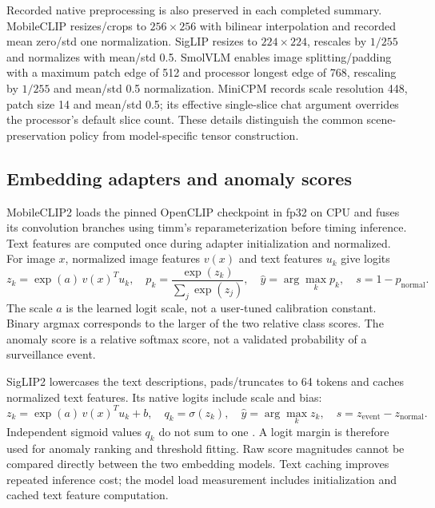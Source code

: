 \documentclass[11pt,a4paper]{article}
\begin{document}
Recorded native preprocessing is also preserved in each completed summary. MobileCLIP resizes/crops to $256\times256$ with bilinear interpolation and recorded mean zero/std one normalization. SigLIP resizes to $224\times224$, rescales by $1/255$ and normalizes with mean/std 0.5. SmolVLM enables image splitting/padding with a maximum patch edge of 512 and processor longest edge of 768, rescaling by $1/255$ and mean/std 0.5 normalization. MiniCPM records scale resolution 448, patch size 14 and mean/std 0.5; its effective single-slice chat argument overrides the processor's default slice count. These details distinguish the common scene-preservation policy from model-specific tensor construction.

\subsection{Embedding adapters and anomaly scores}
MobileCLIP2 loads the pinned OpenCLIP checkpoint in fp32 on CPU and fuses its convolution branches using timm's reparameterization before timing inference. Text features are computed once during adapter initialization and normalized. For image $x$, normalized image features $v(x)$ and text features $u_k$ give logits
\begin{equation}
 z_k = \exp(a)\,v(x)^T u_k,\quad
 p_k=\frac{\exp(z_k)}{\sum_j\exp(z_j)},\quad
 \hat y=\arg\max_k p_k,\quad s=1-p_{\mathrm{normal}}.
\end{equation}
The scale $a$ is the learned logit scale, not a user-tuned calibration constant. Binary argmax corresponds to the larger of the two relative class scores. The anomaly score is a relative softmax score, not a validated probability of a surveillance event.

SigLIP2 lowercases the text descriptions, pads/truncates to 64 tokens and caches normalized text features. Its native logits include scale and bias:
\begin{equation}
 z_k=\exp(a)\,v(x)^Tu_k+b,\quad
 q_k=\sigma(z_k),\quad \hat y=\arg\max_k z_k,\quad
 s=z_{\mathrm{event}}-z_{\mathrm{normal}}.
\end{equation}
Independent sigmoid values $q_k$ do not sum to one \cite{siglippaper}. A logit margin is therefore used for anomaly ranking and threshold fitting. Raw score magnitudes cannot be compared directly between the two embedding models. Text caching improves repeated inference cost; the model load measurement includes initialization and cached text feature computation.
\end{document}
